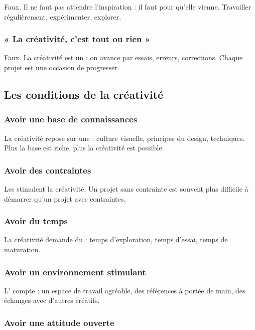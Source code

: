 Faux. Il ne faut pas attendre l'inspiration : il faut  pour qu'elle vienne. Travailler régulièrement, expérimenter, explorer.

\subsubsection{« La créativité, c'est tout ou rien »}

Faux. La créativité est un  : on avance par essais, erreurs, corrections. Chaque projet est une occasion de progresser.

\subsection{Les conditions de la créativité}

\subsubsection{Avoir une base de connaissances}

La créativité repose sur une  : culture visuelle, principes du design, techniques. Plus la base est riche, plus la créativité est possible.

\subsubsection{Avoir des contraintes}

Les  stimulent la créativité. Un projet sans contrainte est souvent plus difficile à démarrer qu'un projet avec contraintes.

\subsubsection{Avoir du temps}

La créativité demande du  : temps d'exploration, temps d'essai, temps de maturation.

\subsubsection{Avoir un environnement stimulant}

L' compte : un espace de travail agréable, des références à portée de main, des échanges avec d'autres créatifs.

\subsubsection{Avoir une attitude ouverte}

